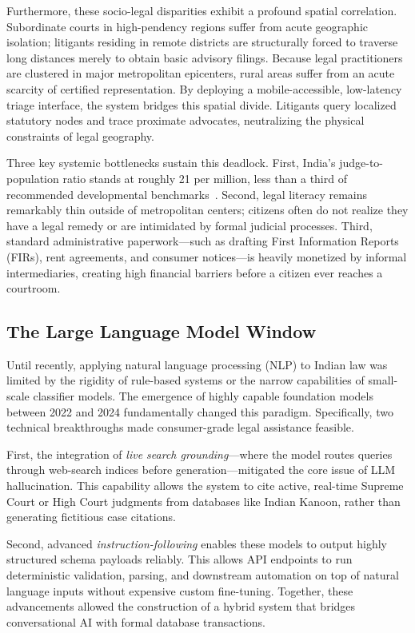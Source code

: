 \documentclass[conference]{IEEEtran}
\begin{document}
Furthermore, these socio-legal disparities exhibit a profound spatial correlation. Subordinate courts in high-pendency regions suffer from acute geographic isolation; litigants residing in remote districts are structurally forced to traverse long distances merely to obtain basic advisory filings. Because legal practitioners are clustered in major metropolitan epicenters, rural areas suffer from an acute scarcity of certified representation. By deploying a mobile-accessible, low-latency triage interface, the system bridges this spatial divide. Litigants query localized statutory nodes and trace proximate advocates, neutralizing the physical constraints of legal geography.

Three key systemic bottlenecks sustain this deadlock. First, India's judge-to-population ratio stands at roughly 21 per million, less than a third of recommended developmental benchmarks~\cite{vidhi2022}. Second, legal literacy remains remarkably thin outside of metropolitan centers; citizens often do not realize they have a legal remedy or are intimidated by formal judicial processes. Third, standard administrative paperwork---such as drafting First Information Reports (FIRs), rent agreements, and consumer notices---is heavily monetized by informal intermediaries, creating high financial barriers before a citizen ever reaches a courtroom.

\subsection{The Large Language Model Window}
Until recently, applying natural language processing (NLP) to Indian law was limited by the rigidity of rule-based systems or the narrow capabilities of small-scale classifier models. The emergence of highly capable foundation models between 2022 and 2024 fundamentally changed this paradigm. Specifically, two technical breakthroughs made consumer-grade legal assistance feasible. 

First, the integration of \emph{live search grounding}---where the model routes queries through web-search indices before generation---mitigated the core issue of LLM hallucination. This capability allows the system to cite active, real-time Supreme Court or High Court judgments from databases like Indian Kanoon, rather than generating fictitious case citations. 

Second, advanced \emph{instruction-following} enables these models to output highly structured schema payloads reliably. This allows API endpoints to run deterministic validation, parsing, and downstream automation on top of natural language inputs without expensive custom fine-tuning. Together, these advancements allowed the construction of a hybrid system that bridges conversational AI with formal database transactions.
\end{document}

